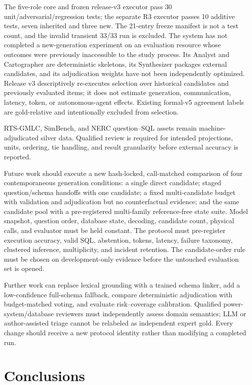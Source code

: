 \documentclass[applsci,article,submit,moreauthors]{Definitions/mdpi}
\begin{document}
The five-role core and frozen release-v3 executor pass 30 unit/adversarial/regression tests; the separate R3 executor passes 10 additive tests, seven inherited and three new. The 21-entry freeze manifest is not a test count, and the invalid transient 33/33 run is excluded. The system has not completed a new-generation experiment on an evaluation resource whose outcomes were previously inaccessible to the study process. Its Analyst and Cartographer are deterministic skeletons, its Synthesizer packages external candidates, and its adjudication weights have not been independently optimized. Release v3 descriptively re-executes selection over historical candidates and previously evaluated items; it does not estimate generation, communication, latency, token, or autonomous-agent effects. Existing formal-v5 agreement labels are gold-relative and intentionally excluded from selection.

RTS-GMLC, SimBench, and NERC question--SQL assets remain machine-adjudicated silver data. Qualified review is required for intended projections, units, ordering, tie handling, and result granularity before external accuracy is reported.

Future work should execute a new hash-locked, call-matched comparison of four contemporaneous generation conditions: a single direct candidate; staged question/schema handoffs with one candidate; a fixed multi-candidate budget with validation and adjudication but no counterfactual evidence; and the same candidate pool with a pre-registered multi-family reference-free state suite. Model snapshot, question order, database state, decoding, candidate count, physical calls, and evaluator must be held constant. The protocol must pre-register execution accuracy, valid SQL, abstention, tokens, latency, failure taxonomy, clustered inference, multiplicity, and incident retention. The candidate-order rule must be chosen on development-only evidence before the untouched evaluation set is opened.

Further work can replace lexical grounding with a trained schema linker, add a low-confidence full-schema fallback, compare deterministic adjudication with budget-matched voting, and evaluate risk--coverage calibration. Qualified power-system/database reviewers must independently assess domain semantics; LLM or author-assisted triage cannot be relabeled as independent expert gold. Every change should receive a new protocol identity rather than modifying a completed run.

\section{Conclusions}
\end{document}
